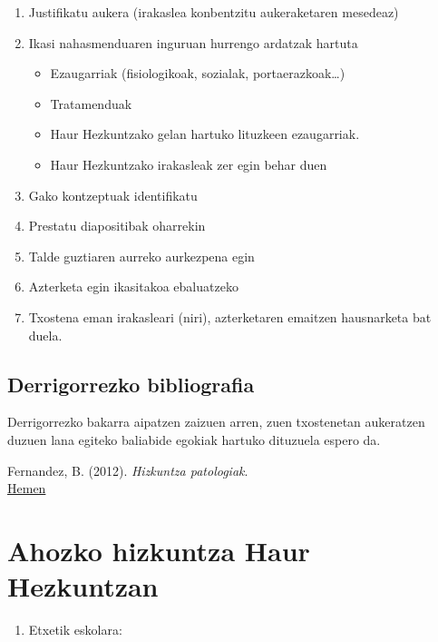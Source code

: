 \documentclass[
]{book}
\providecommand{\tightlist}{%
  \setlength{\itemsep}{0pt}\setlength{\parskip}{0pt}}
\begin{document}
\begin{enumerate}
\def\labelenumi{\arabic{enumi}.}
\tightlist
\item
  Justifikatu aukera (irakaslea konbentzitu aukeraketaren mesedeaz)
\item
  Ikasi nahasmenduaren inguruan hurrengo ardatzak hartuta

  \begin{itemize}
  \tightlist
  \item
    Ezaugarriak (fisiologikoak, sozialak, portaerazkoak\ldots)
  \item
    Tratamenduak
  \item
    Haur Hezkuntzako gelan hartuko lituzkeen ezaugarriak.
  \item
    Haur Hezkuntzako irakasleak zer egin behar duen
  \end{itemize}
\item
  Gako kontzeptuak identifikatu
\item
  Prestatu diapositibak oharrekin
\item
  Talde guztiaren aurreko aurkezpena egin
\item
  Azterketa egin ikasitakoa ebaluatzeko
\item
  Txostena eman irakasleari (niri), azterketaren emaitzen hausnarketa bat duela.
\end{enumerate}

\hypertarget{derrigorrezko-bibliografia}{%
\section{Derrigorrezko bibliografia}\label{derrigorrezko-bibliografia}}

Derrigorrezko bakarra aipatzen zaizuen arren, zuen txostenetan aukeratzen duzuen lana egiteko baliabide egokiak hartuko dituzuela espero da.

Fernandez, B. (2012). \emph{Hizkuntza patologiak}.\\
\href{../Baliabideak/Fernandez-2012-hizkuntza-patologiak-eta-afasiak-garbi-.pdf}{Hemen}

\hypertarget{ahozko-hizkuntza-haur-hezkuntzan}{%
\chapter{Ahozko hizkuntza Haur Hezkuntzan}\label{ahozko-hizkuntza-haur-hezkuntzan}}

\begin{enumerate}
\def\labelenumi{\arabic{enumi}.}
\tightlist
\item
  Etxetik eskolara:\\
\end{enumerate}
\end{document}
